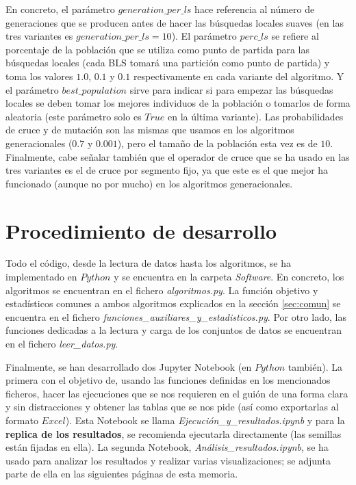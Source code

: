 \documentclass[11pt,a4paper]{article}
\begin{document}
	En concreto, el parámetro $generation\_per\_ls$ hace referencia al número de generaciones que se producen antes de hacer las búsquedas locales suaves (en las tres variantes es $generation\_per\_ls=10$). El parámetro $perc\_ls$ se refiere al porcentaje de la población que se utiliza como punto de partida para las búsquedas locales (cada BLS tomará una partición como punto de partida) y toma los valores $1.0$, $0.1$ y $0.1$ respectivamente en cada variante del algoritmo. Y el parámetro $best\_population$ sirve para indicar si para empezar las búsquedas locales se deben tomar los mejores individuos de la población o tomarlos de forma aleatoria (este parámetro solo es $True$ en la última variante). Las probabilidades de cruce y de mutación son las mismas que usamos en los algoritmos generacionales ($0.7$ y $0.001$), pero el tamaño de la población esta vez es de $10$. Finalmente, cabe señalar también que el operador de cruce que se ha usado en las tres variantes es el de cruce por segmento fijo, ya que este es el que mejor ha funcionado (aunque no por mucho) en los algoritmos generacionales. 
	
	

    \clearpage
	\section{Procedimiento de desarrollo}
	
	Todo el código, desde la lectura de datos hasta los algoritmos, se ha implementado en $Python$ y se encuentra en la carpeta \textit{Software}. En concreto, los algoritmos se encuentran en el fichero \textit{algoritmos.py}. La función objetivo y estadísticos comunes a ambos algoritmos explicados en la sección \ref{sec:comun} se encuentra en el fichero \textit{funciones\_auxiliares\_y\_estadisticos.py}. Por otro lado, las funciones dedicadas a la lectura y carga de los conjuntos de datos se encuentran en el fichero \textit{leer\_datos.py}.
	
	Finalmente, se han desarrollado dos Jupyter Notebook (en $Python$ también). La primera con el objetivo de, usando las funciones definidas en los mencionados ficheros, hacer las ejecuciones que se nos requieren en el guión de una forma clara y sin distracciones y obtener las tablas que se nos pide (así como exportarlas al formato $Excel$). Esta Notebook se llama \textit{Ejecución\_y\_resultados.ipynb} y para la \textbf{replica de los resultados}, se recomienda ejecutarla directamente (las semillas están fijadas en ella). La segunda Notebook, \textit{Análisis\_resultados.ipynb}, se ha usado para analizar los resultados y realizar varias visualizaciones; se adjunta parte de ella en las siguientes páginas de esta memoria.
	
\end{document}
